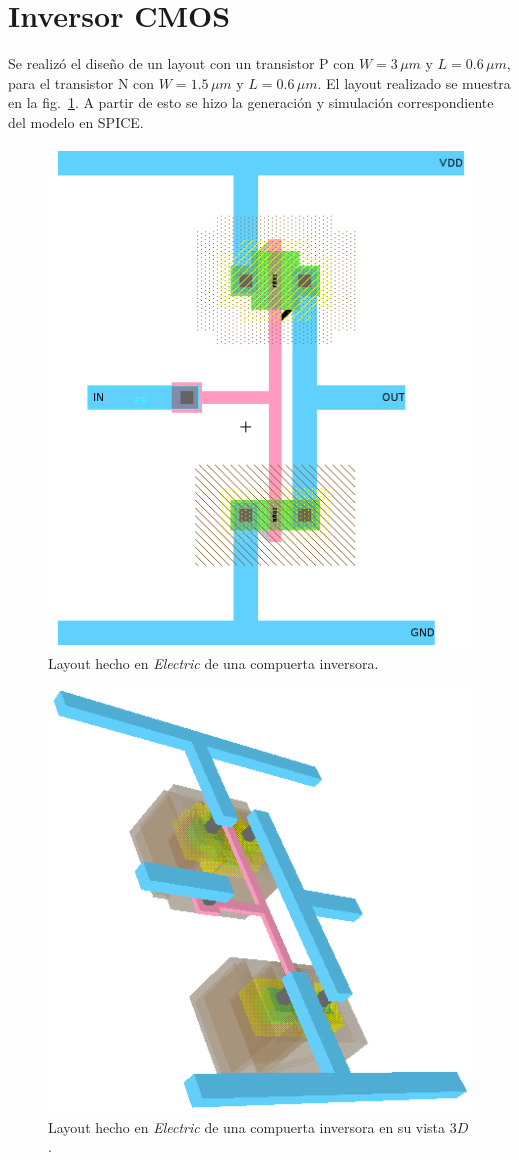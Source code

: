 \documentclass[twocolumn]{IEEEtran}
\begin{document}
\section{Inversor CMOS}
\noindent
Se realizó el diseño de un layout con un transistor P con $W=3\, \mu m$ y $L=0.6 \,\mu m$, para el transistor N con $W=1.5\, \mu m$ y $L=0.6 \,\mu m$. El layout realizado se muestra en la fig.~\ref{fig1}. A partir de esto se hizo la generación y simulación correspondiente del modelo en SPICE.
\begin{figure}[H]
  \centering
    \includegraphics[scale=0.35]{pics/inversor.png}
      \caption{Layout hecho en \textit{Electric} de una compuerta inversora.}
	\label{fig1}
\end{figure}
\begin{figure}[H]
  \centering
    \includegraphics[scale=0.35]{pics/inversor3d.png}
      \caption{Layout hecho en \textit{Electric} de una compuerta inversora en su vista $3D$.}
	\label{fig2}
\end{figure}
\end{document}
